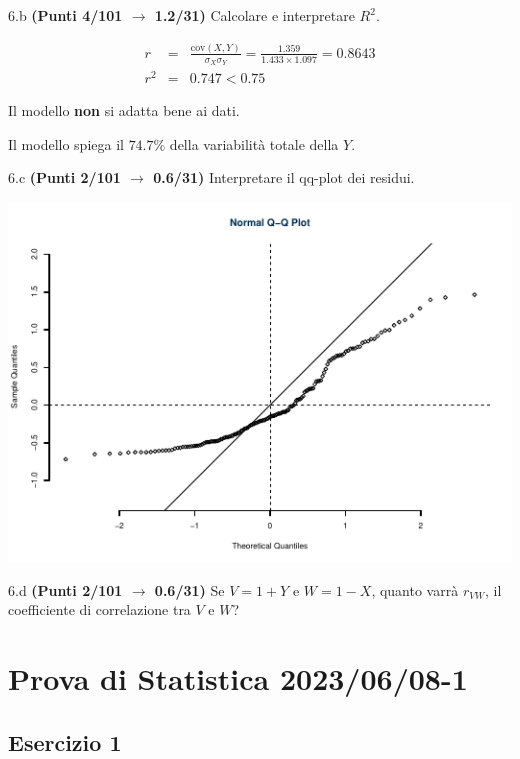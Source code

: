 \documentclass[
  11pt,
]{book}
\theoremstyle{mytheoremstyle}
\theoremstyle{mydefstyle}
\newenvironment{sol}
  {
  \begin{tcolorbox}[enhanced,breakable,arc=0.1mm,boxrule=1pt,colback=white,colframe=iblue,
  title=\bf \fontfamily{lmss}\selectfont \hspace{.5 cm} Soluzione,drop fuzzy shadow]

}{
\end{tcolorbox}
  }
\begin{document}
6.b \textbf{(Punti 4/101 \(\rightarrow\) 1.2/31)} Calcolare e interpretare \(R^2\).

\begin{sol}
\begin{eqnarray*}
r&=&\frac{\text{cov}(X,Y)}{\sigma_X\sigma_Y}=\frac{ 1.359 }{ 1.433 \times 1.097 }= 0.8643 \\ 
r^2&=& 0.747 < 0.75
\end{eqnarray*}

Il modello \textbf{non} si adatta bene ai dati.

Il modello spiega il \(74.7\%\) della variabilità totale della \(Y\).

\end{sol}

6.c \textbf{(Punti 2/101 \(\rightarrow\) 0.6/31)} Interpretare il qq-plot dei residui.

\begin{center}\includegraphics{Esami_passati_con_soluzioni_files/figure-latex/2023-32,-1} \end{center}

6.d \textbf{(Punti 2/101 \(\rightarrow\) 0.6/31)} Se \(V=1+ Y\) e \(W=1-X\), quanto varrà \(r_{VW}\), il coefficiente di correlazione tra \(V\) e \(W\)?

\section{Prova di Statistica 2023/06/08-1}\label{prova-di-statistica-20230608-1}

\subsection{Esercizio 1}\label{esercizio-1-25}
\end{document}
